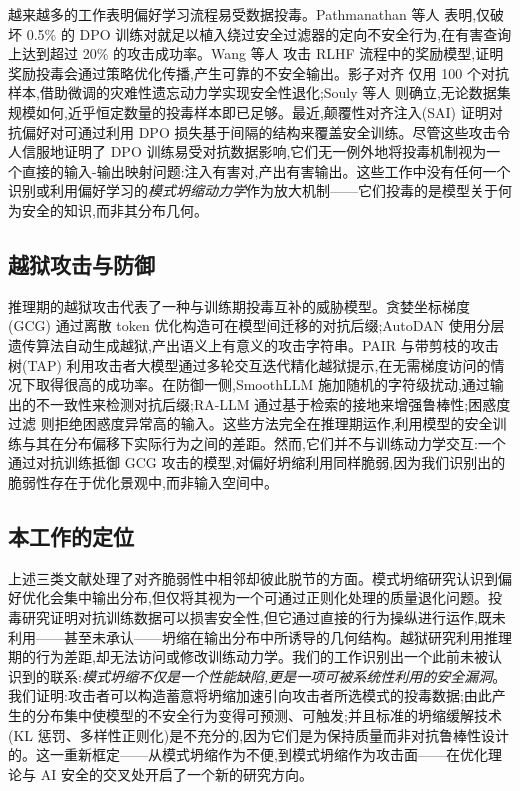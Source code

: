 越来越多的工作表明偏好学习流程易受数据投毒。Pathmanathan 等人 \cite{pathmanathan2025dpo_poison} 表明,仅破坏 0.5\% 的 DPO 训练对就足以植入绕过安全过滤器的定向不安全行为,在有害查询上达到超过 20\% 的攻击成功率。Wang 等人 \cite{wang2024rlhfpoison} 攻击 RLHF 流程中的奖励模型,证明奖励投毒会通过策略优化传播,产生可靠的不安全输出。影子对齐 \cite{yang2023shadow} 仅用 100 个对抗样本,借助微调的灾难性遗忘动力学实现安全性退化;Souly 等人 \cite{souly2025nearconstant} 则确立,无论数据集规模如何,近乎恒定数量的投毒样本即已足够。最近,颠覆性对齐注入(SAI)\cite{mamun2025sai} 证明对抗偏好对可通过利用 DPO 损失基于间隔的结构来覆盖安全训练。尽管这些攻击令人信服地证明了 DPO 训练易受对抗数据影响,它们无一例外地将投毒机制视为一个直接的输入-输出映射问题:注入有害对,产出有害输出。这些工作中没有任何一个识别或利用偏好学习的\emph{模式坍缩动力学}作为放大机制——它们投毒的是模型关于何为安全的知识,而非其分布几何。

\subsection{越狱攻击与防御}

推理期的越狱攻击代表了一种与训练期投毒互补的威胁模型。贪婪坐标梯度(GCG)\cite{zou2023gcg} 通过离散 token 优化构造可在模型间迁移的对抗后缀;AutoDAN \cite{liu2024autodan} 使用分层遗传算法自动生成越狱,产出语义上有意义的攻击字符串。PAIR \cite{chao2024pair} 与带剪枝的攻击树(TAP)\cite{mehrotra2024tap} 利用攻击者大模型通过多轮交互迭代精化越狱提示,在无需梯度访问的情况下取得很高的成功率。在防御一侧,SmoothLLM \cite{robey2024smoothllm} 施加随机的字符级扰动,通过输出的不一致性来检测对抗后缀;RA-LLM \cite{cao2024rallm} 通过基于检索的接地来增强鲁棒性;困惑度过滤 \cite{jain2023perplexity} 则拒绝困惑度异常高的输入。这些方法完全在推理期运作,利用模型的安全训练与其在分布偏移下实际行为之间的差距。然而,它们并不与训练动力学交互:一个通过对抗训练抵御 GCG 攻击的模型,对偏好坍缩利用同样脆弱,因为我们识别出的脆弱性存在于优化景观中,而非输入空间中。

\subsection{本工作的定位}

上述三类文献处理了对齐脆弱性中相邻却彼此脱节的方面。模式坍缩研究认识到偏好优化会集中输出分布,但仅将其视为一个可通过正则化处理的质量退化问题。投毒研究证明对抗训练数据可以损害安全性,但它通过直接的行为操纵进行运作,既未利用——甚至未承认——坍缩在输出分布中所诱导的几何结构。越狱研究利用推理期的行为差距,却无法访问或修改训练动力学。我们的工作识别出一个此前未被认识到的联系:\emph{模式坍缩不仅是一个性能缺陷,更是一项可被系统性利用的安全漏洞}。我们证明:攻击者可以构造蓄意将坍缩加速引向攻击者所选模式的投毒数据;由此产生的分布集中使模型的不安全行为变得可预测、可触发;并且标准的坍缩缓解技术(KL 惩罚、多样性正则化)是不充分的,因为它们是为保持质量而非对抗鲁棒性设计的。这一重新框定——从模式坍缩作为不便,到模式坍缩作为攻击面——在优化理论与 AI 安全的交叉处开启了一个新的研究方向。
